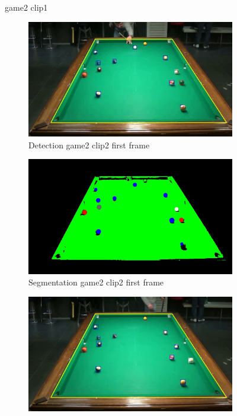 \begin{figure}[H]
	\caption{game2 clip1}
\end{figure}


\begin{figure}[H]
	\centering
	\begin{subfigure}[b]{0.48\textwidth}
		\centering
		\includegraphics[width=\textwidth]{images/Detection/game2_clip2_detected_balls_first_frame.jpg}
		\caption{Detection game2 clip2 first frame}
		\label{fig: game2_clip2_first_frame_detected}
	\end{subfigure}
	\begin{subfigure}[b]{0.48\textwidth}
		\centering
		\includegraphics[width=\textwidth]{images/Segmentation/game2_clip2_segmented_balls_first_frame.jpg}
		\caption{Segmentation game2 clip2 first frame}
		\label{fig: game2_clip2_first_frame_segmented}
	\end{subfigure}
	\begin{subfigure}[b]{0.48\textwidth}
		\centering
		\includegraphics[width=\textwidth]{images/Detection/game2_clip2_detected_balls_last_frame.jpg}

\end{subfigure}
\end{figure}
